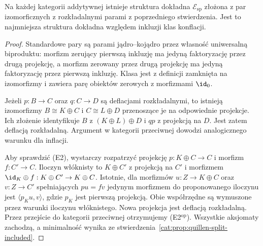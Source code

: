 \begin{twierdzenie}\label{cat:thm:quillen-split-structure}
Na każdej kategorii addytywnej istnieje struktura dokładna $\mathscr E_{\mathrm{sp}}$ złożona z par izomorficznych z rozkładalnymi parami z poprzedniego stwierdzenia. Jest to najmniejsza struktura dokładna względem inkluzji klas konflacji.
\end{twierdzenie}
\begin{proof}
Standardowe pary są parami jądro--kojądro przez własność uniwersalną biproduktu: morfizm zerujący pierwszą inkluzję ma jedyną faktoryzację przez drugą projekcję, a morfizm zerowany przez drugą projekcję ma jedyną faktoryzację przez pierwszą inkluzję. Klasa jest z definicji zamknięta na izomorfizmy i zawiera parę obiektów zerowych z morfizmami $\id_0$.

Jeżeli $p:B\to C$ oraz $q:C\to D$ są deflacjami rozkładalnymi, to istnieją izomorfizmy $B\cong K\oplus C$ i $C\cong L\oplus D$ przenoszące je na odpowiednie projekcje. Ich złożenie identyfikuje $B$ z $(K\oplus L)\oplus D$ i $qp$ z projekcją na $D$. Jest zatem deflacją rozkładalną. Argument w kategorii przeciwnej dowodzi analogicznego warunku dla inflacji.

Aby sprawdzić (E2), wystarczy rozpatrzyć projekcję $p:K\oplus C\to C$ i morfizm $f:C'\to C$. Iloczyn włóknisty to $K\oplus C'$ z projekcją na $C'$ i morfizmem $\id_K\oplus f:K\oplus C'\to K\oplus C$. Istotnie, dla morfizmów $u:Z\to K\oplus C$ oraz $v:Z\to C'$ spełniających $pu=fv$ jedynym morfizmem do proponowanego iloczynu jest $\langle p_Ku,v\rangle$, gdzie $p_K$ jest pierwszą projekcją. Obie współrzędne są wymuszone przez warunki iloczynu włóknistego. Nowa projekcja jest deflacją rozkładalną. Przez przejście do kategorii przeciwnej otrzymujemy (E2$^{\mathrm{op}}$). Wszystkie aksjomaty zachodzą, a minimalność wynika ze stwierdzenia~\ref{cat:prop:quillen-split-included}.
\end{proof}

